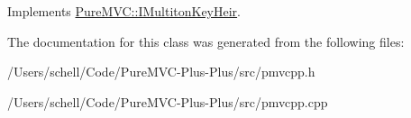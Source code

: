 Implements \hyperlink{class_pure_m_v_c_1_1_i_multiton_key_heir_a03acb75ab79defba2c28b8de1bbe1ca6}{PureMVC::IMultitonKeyHeir}.

The documentation for this class was generated from the following files:\begin{DoxyCompactItemize}
\item 
/Users/schell/Code/PureMVC-\/Plus-\/Plus/src/pmvcpp.h\item 
/Users/schell/Code/PureMVC-\/Plus-\/Plus/src/pmvcpp.cpp\end{DoxyCompactItemize}
